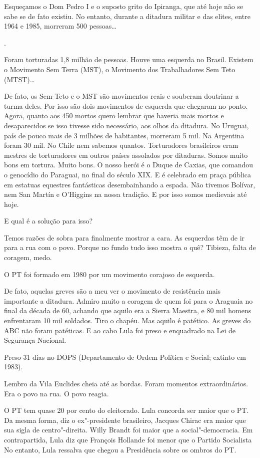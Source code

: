 \falaG Esqueçamos o Dom Pedro I e o suposto grito do Ipiranga, que até hoje
não se sabe se de fato existiu. No entanto, durante a ditadura militar e
das elites, entre 1964 e 1985, morreram 500 pessoas…

.

\falaG Foram torturadas 1,8 milhão de pessoas. Houve uma esquerda no Brasil.
Existem o Movimento Sem Terra (MST), o Movimento dos Trabalhadores Sem
Teto (MTST)…

\falaM De fato, os Sem-Teto e o MST são movimentos reais e souberam
doutrinar a turma deles. Por isso são dois movimentos de esquerda que
chegaram no ponto. Agora, quanto aos 450 mortos quero lembrar que
haveria mais mortos e desaparecidos se isso tivesse sido necessário, aos
olhos da ditadura. No Uruguai, país de pouco mais de 3 milhões de
habitantes, morreram 5 mil. Na Argentina foram 30 mil. No Chile nem
sabemos quantos. Torturadores brasileiros eram mestres de torturadores
em outros países assolados por ditaduras. Somos muito bons em tortura.
Muito bons. O nosso herói é o Duque de Caxias, que comandou o genocídio
do Paraguai, no final do século XIX. E é celebrado em praça pública em
estatuas equestres fantásticas desembainhando a espada. Não tivemos
Bolívar, nem San Martín e O'Higgins na nossa tradição. E por isso somos
medievais até hoje.

\falaG E qual é a solução para isso?

\falaM Temos razões de sobra para finalmente mostrar a cara. As esquerdas
têm de ir para a rua com o povo. Porque no fundo tudo isso mostra o quê?
Tibieza, falta de coragem, medo.

\falaG O PT foi formado em 1980 por um movimento corajoso de esquerda.

\falaM De fato, aquelas greves são a meu ver o movimento de resistência mais
importante a ditadura. Admiro muito a coragem de quem foi para o
Araguaia no final da década de 60, achando que aquilo era a Sierra
Maestra, e 80 mil homens enfrentaram 10 mil soldados. Tiro o chapéu. Mas
aquilo é patético. As greves do ABC não foram patéticas. E ao cabo Lula
foi preso e enquadrado na Lei de Segurança Nacional.

\falaG Preso 31 dias no DOPS (Departamento de Ordem Política e Social;
extinto em 1983).

\falaM Lembro da Vila Euclides cheia até as bordas. Foram momentos
extraordinários. Era o povo na rua. O povo reagia.

\falaG O PT tem quase 20 por cento do eleitorado. Lula concorda ser maior
que o PT. Da mesma forma, diz o ex"-presidente brasileiro, Jacques Chirac
era maior que sua sigla de centro"-direita. Willy Brandt foi maior que a
social"-democracia. Em contrapartida, Lula diz que François Hollande foi
menor que o Partido Socialista No entanto, Lula ressalva que chegou a
Presidência sobre os ombros do PT.

